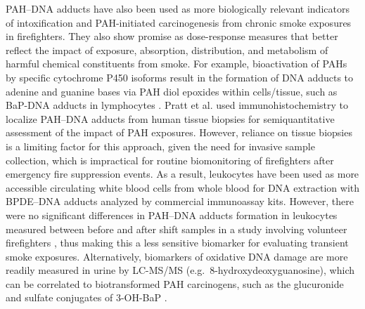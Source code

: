 \documentclass[preprint, 3p,
authoryear]{elsarticle} %
\begin{document}
PAH--DNA adducts have also been used as more biologically relevant
indicators of intoxification and PAH-initiated carcinogenesis from
chronic smoke exposures in firefighters. They also show promise as
dose-response measures that better reflect the impact of exposure,
absorption, distribution, and metabolism of harmful chemical
constituents from smoke. For example, bioactivation of PAHs by specific
cytochrome P450 isoforms result in the formation of DNA adducts to
adenine and guanine bases via PAH diol epoxides within cells/tissue,
such as BaP-DNA adducts in lymphocytes \citep{19}. Pratt et al.
\citep{36} used immunohistochemistry to localize PAH--DNA adducts from
human tissue biopsies for semiquantitative assessment of the impact of
PAH exposures. However, reliance on tissue biopsies is a limiting factor
for this approach, given the need for invasive sample collection, which
is impractical for routine biomonitoring of firefighters after emergency
fire suppression events. As a result, leukocytes have been used as more
accessible circulating white blood cells from whole blood for DNA
extraction with BPDE--DNA adducts analyzed by commercial immunoassay
kits. However, there were no significant differences in PAH--DNA adducts
formation in leukocytes measured between before and after shift samples
in a study involving volunteer firefighters \citep{37}, thus making this
a less sensitive biomarker for evaluating transient smoke exposures.
Alternatively, biomarkers of oxidative DNA damage are more readily
measured in urine by LC-MS/MS (e.g.~8-hydroxydeoxyguanosine), which can
be correlated to biotransformed PAH carcinogens, such as the glucuronide
and sulfate conjugates of 3-OH-BaP \citep{38}.
\end{document}

